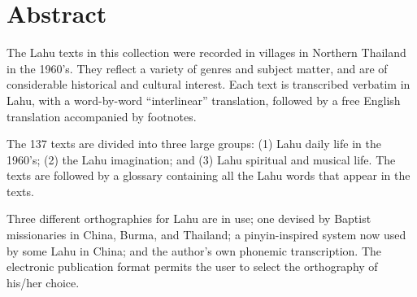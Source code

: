 \vspace{0.25em}

\renewcommand{\thefootnote}{\arabic{footnote}}
\setcounter{footnote}{0}

\section*{Abstract}

The Lahu texts in this collection were recorded in villages in
Northern Thailand in the 1960's. They reflect a variety of genres and
subject matter, and are of considerable historical and cultural
interest. Each text is transcribed verbatim in Lahu, with a
word-by-word ``interlinear'' translation, followed by a free English
translation accompanied by footnotes.

The 137 texts are divided into three large groups: (1) Lahu daily life
in the 1960's; (2) the Lahu imagination; and (3) Lahu spiritual and
musical life. The texts are followed by a glossary containing all the
Lahu words that appear in the texts.

Three different orthographies for Lahu are in use; one devised by
Baptist missionaries in China, Burma, and Thailand; a pinyin-inspired
system now used by some Lahu in China; and the author's own phonemic
transcription. The electronic publication format permits the user to
select the orthography of his/her choice.
